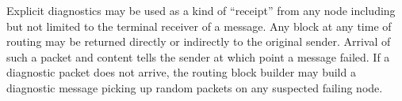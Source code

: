 \documentclass[9pt,journal,compsoc]{IEEEtran}
\begin{document}
Explicit diagnostics may be used as a kind of ``receipt'' from any node including but not limited to the terminal receiver of a message. Any block at any time of routing may be returned directly or indirectly to the original sender. Arrival of such a packet and content tells the sender at which point a message failed. If a diagnostic packet does not arrive, the routing block builder may build a diagnostic message picking up random packets on any suspected failing node.

%
%



%
%
\end{document}
